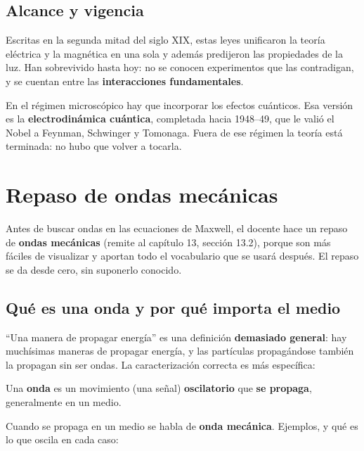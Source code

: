 \documentclass[12pt,a4paper]{article}
\begin{document}
\subsection{Alcance y vigencia}

Escritas en la segunda mitad del siglo XIX, estas leyes unificaron la teoría
eléctrica y la magnética en una sola y además predijeron las propiedades de
la luz. Han sobrevivido hasta hoy: no se conocen experimentos que las
contradigan, y se cuentan entre las \textbf{interacciones fundamentales}.

\begin{notebox}
En el régimen microscópico hay que incorporar los efectos cuánticos. Esa
versión es la \textbf{electrodinámica cuántica}, completada hacia 1948--49,
que le valió el Nobel a Feynman, Schwinger y Tomonaga. Fuera de ese régimen
la teoría está terminada: no hubo que volver a tocarla.
\end{notebox}

\section{Repaso de ondas mecánicas}

Antes de buscar ondas en las ecuaciones de Maxwell, el docente hace un repaso
de \textbf{ondas mecánicas} (remite al capítulo 13, sección 13.2), porque son
más fáciles de visualizar y aportan todo el vocabulario que se usará después.
El repaso se da desde cero, sin suponerlo conocido.

\subsection{Qué es una onda y por qué importa el medio}

\enquote{Una manera de propagar energía} es una definición \textbf{demasiado
general}: hay muchísimas maneras de propagar energía, y las partículas
propagándose también la propagan sin ser ondas. La caracterización correcta
es más específica:

\begin{keybox}[Definición]
Una \textbf{onda} es un movimiento (una señal) \textbf{oscilatorio} que
\textbf{se propaga}, generalmente en un medio.
\end{keybox}

Cuando se propaga en un medio se habla de \textbf{onda mecánica}. Ejemplos, y
qué es lo que oscila en cada caso:
\end{document}
